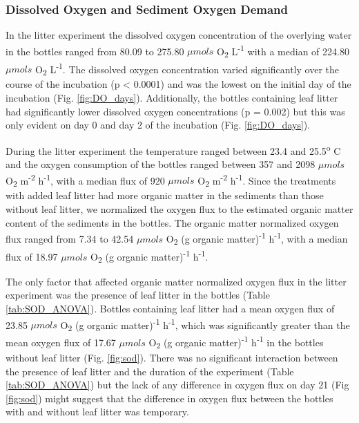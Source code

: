 \subsubsection{Dissolved Oxygen and Sediment Oxygen Demand}
In the litter experiment the dissolved oxygen concentration of the overlying water in the bottles ranged from 80.09 to 275.80 $\mu mols$ O\textsubscript{2} L\textsuperscript{-1} with a median of 224.80 $\mu mols$ O\textsubscript{2} L\textsuperscript{-1}.  The dissolved oxygen concentration varied significantly over the course of the incubation (p < 0.0001) and was the lowest on the initial day of the incubation (Fig. \ref{fig:DO_days}). Additionally, the bottles containing leaf litter had significantly lower dissolved oxygen concentrations (p = 0.002) but this was only evident on day 0 and day 2 of the incubation (Fig. \ref{fig:DO_days}).

During the litter experiment the temperature ranged between 23.4 and 25.5\textsuperscript{o} C and the oxygen consumption of the bottles ranged between 357 and 2098 $\mu mols$ O\textsubscript{2} m\textsuperscript{-2} h\textsuperscript{-1}, with a median flux of 920 $\mu mols$ O\textsubscript{2} m\textsuperscript{-2} h\textsuperscript{-1}. Since the treatments with added leaf litter had more organic matter in the sediments than those without leaf litter, we normalized the oxygen flux to the estimated organic matter content of the sediments in the bottles. The organic matter normalized oxygen flux ranged from 7.34 to 42.54 $\mu mols$ O\textsubscript{2} (g organic matter)\textsuperscript{-1} h\textsuperscript{-1}, with a median flux of 18.97 $\mu mols$ O\textsubscript{2} (g organic matter)\textsuperscript{-1} h\textsuperscript{-1}.

The only factor that affected organic matter normalized oxygen flux in the litter experiment was the presence of leaf litter in the bottles (Table \ref{tab:SOD_ANOVA}). Bottles containing leaf litter had a mean oxygen flux of 23.85 $\mu mols$ O\textsubscript{2} (g organic matter)\textsuperscript{-1} h\textsuperscript{-1}, which was significantly greater than the mean oxygen flux of 17.67 $\mu mols$ O\textsubscript{2} (g organic matter)\textsuperscript{-1} h\textsuperscript{-1} in the bottles without leaf litter (Fig. \ref{fig:sod}). There was no significant interaction between the presence of leaf litter and the duration of the experiment (Table \ref{tab:SOD_ANOVA}) but the lack of any difference in oxygen flux on day 21 (Fig \ref{fig:sod}) might suggest that the difference in oxygen flux between the bottles with and without leaf litter was temporary. 

